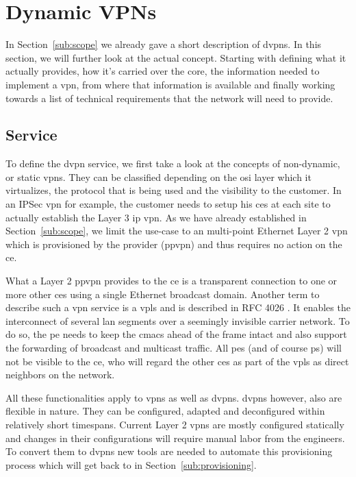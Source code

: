 \section{Dynamic VPNs} %
\label{sec:dvpns}

In Section~\ref{sub:scope} we already gave a short description of \acp{dvpn}. In this section, we will further look at the actual concept. Starting with defining what it actually provides, how it's carried over the core, the information needed to implement a \ac{vpn}, from where that information is available and finally working towards a list of technical requirements that the network will need to provide.

\subsection{Service} %
\label{sub:service}

To define the \ac{dvpn} service, we first take a look at the concepts of non-dynamic, or static \acp{vpn}. They can be classified depending on the \acs{osi} layer which it virtualizes, the protocol that is being used and the visibility to the customer. In an IPSec \ac{vpn} for example, the customer needs to setup his \acp{ce} at each site to actually establish the Layer 3 \acs{ip} \ac{vpn}. As we have already established in Section~\ref{sub:scope}, we limit the use-case to an multi-point Ethernet Layer 2 \ac{vpn} which is provisioned by the provider (\acs{ppvpn}) and thus requires no action on the \ac{ce}.

What a Layer 2 \ac{ppvpn} provides to the \ac{ce} is a transparent connection to one or more other \acp{ce} using a single Ethernet broadcast domain. Another term to describe such a \ac{vpn} service is a \ac{vpls} and is described in RFC 4026  \cite{vpn-terms}. It enables the interconnect of several \acs{lan} segments over a seemingly invisible carrier network. To do so, the \ac{pe} needs to keep the \acp{cmac} ahead of the frame intact and also support the forwarding of broadcast and multicast traffic. All \acp{pe} (and of course \acp{p}) will not be visible to the \ac{ce}, who will regard the other \acp{ce} as part of the \ac{vpls} as direct neighbors on the network.

All these functionalities apply to \acp{vpn} as well as \acp{dvpn}. \acp{dvpn} however, also are flexible in nature. They can be configured, adapted and deconfigured within relatively short timespans. Current Layer 2 \acp{vpn} are mostly configured statically and changes in their configurations will require manual labor from the engineers. To convert them to \acp{dvpn} new tools are needed to automate this provisioning process which will get back to in Section~\ref{sub:provisioning}.

